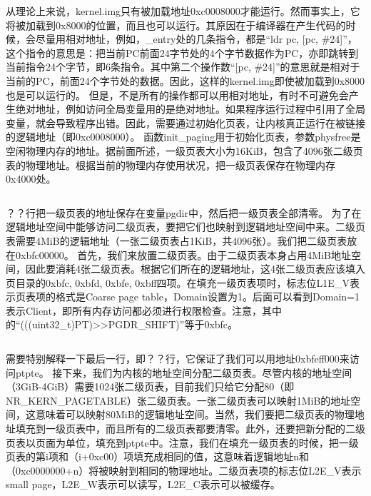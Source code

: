 \documentclass[main.tex]{subfiles}
\begin{document}
\begin{CJK*}{UTF8}{song}
从理论上来说，kernel.img只有被加载地址0xc0008000才能运行。然而事实上，它将被加载到0x8000的位置，而且也可以运行。其原因在于编译器在产生代码的时候，会尽量用相对地址，例如，\_entry处的几条指令，都是“ldr pc, [pc, \#24]”，这个指令的意思是：把当前PC前面24字节处的4个字节数据作为PC，亦即跳转到当前指令24个字节，即6条指令。其中第二个操作数“[pc, \#24]”的意思就是相对于当前的PC，前面24个字节处的数据。因此，这样的kernel.img即使被加载到0x8000也是可以运行的。
但是，不是所有的操作都可以用相对地址，有时不可避免会产生绝对地址，例如访问全局变量用的是绝对地址。如果程序运行过程中引用了全局变量，就会导致程序出错。因此，需要通过初始化页表，让内核真正运行在被链接的逻辑地址（即0xc0008000）。
函数init\_paging用于初始化页表，参数physfree是空闲物理内存的地址。据前面所述，一级页表大小为16KiB，包含了4096张二级页表的物理地址。根据当前的物理内存使用状况，把一级页表保存在物理内存0x4000处。
\inputminted[firstline=135,lastline=147,linenos,numbersep=5pt,frame=lines,framesep=2mm]{c}{src/chapter04/kernel/machdep.c}

？？行把一级页表的地址保存在变量pgdir中，然后把一级页表全部清零。
为了在逻辑地址空间中能够访问二级页表，要把它们也映射到逻辑地址空间中来。二级页表需要4MiB的逻辑地址（一张二级页表占1KiB，共4096张）。我们把二级页表放在0xbfc00000。
首先，我们来放置二级页表。由于二级页表本身占用4MiB地址空间，因此要消耗4张二级页表。根据它们所在的逻辑地址，这4张二级页表应该填入页目录的0xbfc, 0xbfd, 0xbfe, 0xbff四项。在填充一级页表项时，标志位L1E\_V表示页表项的格式是Coarse page table，Domain设置为1。后面可以看到Domain=1表示Client，即所有内存访问都必须进行权限检查。注意，其中的“(((uint32\_t)PT)>>PGDR\_SHIFT)”等于0xbfc。

\inputminted[firstline=149,lastline=159,linenos,numbersep=5pt,frame=lines,framesep=2mm]{c}{src/chapter04/kernel/machdep.c}

需要特别解释一下最后一行，即？？行，它保证了我们可以用地址0xbfeff000来访问ptpte。
接下来，我们为内核的地址空间分配二级页表。尽管内核的地址空间（3GiB-4GiB）需要1024张二级页表，目前我们只给它分配80（即NR\_KERN\_PAGETABLE）张二级页表。一张二级页表可以映射1MiB的地址空间，这意味着可以映射80MiB的逻辑地址空间。当然，我们要把二级页表的物理地址填充到一级页表中，而且所有的二级页表都要清零。此外，还要把新分配的二级页表以页面为单位，填充到ptpte中。注意，我们在填充一级页表的时候，把一级页表的第i项和（i+0xc00）项填充成相同的值，这意味着逻辑地址n和（0xc0000000+n）将被映射到相同的物理地址。二级页表项的标志位L2E\_V表示small page，L2E\_W表示可以读写，L2E\_C表示可以被缓存。

\inputminted[firstline=161,lastline=173,linenos,numbersep=5pt,frame=lines,framesep=2mm]{c}{src/chapter04/kernel/machdep.c}



\end{CJK*}
\end{document}
